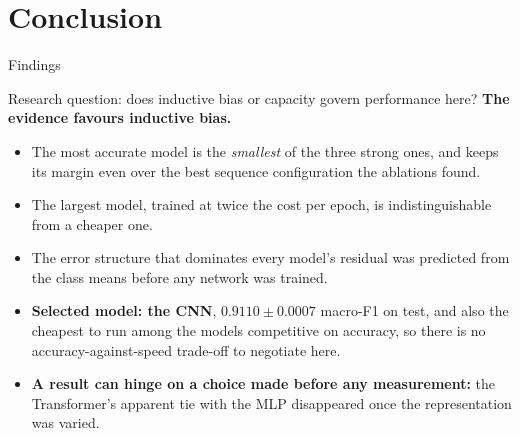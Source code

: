 
\section{Conclusion}

\begin{frame}{Findings}
\small
\begin{block}{Research question: does inductive bias or capacity govern performance here?}
\textbf{The evidence favours inductive bias.}
\end{block}

\begin{itemize}
    \item The most accurate model is the \emph{smallest} of the three strong ones, and keeps its margin
          even over the best sequence configuration the ablations found.
    \item The largest model, trained at twice the cost per epoch, is indistinguishable from a cheaper one.
    \item The error structure that dominates every model's residual was predicted from the class means
          before any network was trained.
    \item \textbf{Selected model: the CNN}, $0.9110 \pm 0.0007$ macro-F1 on test, and also the cheapest
          to run among the models competitive on accuracy, so there is no accuracy-against-speed
          trade-off to negotiate here.
    \item \textbf{A result can hinge on a choice made before any measurement:} the Transformer's
          apparent tie with the MLP disappeared once the representation was varied.
\end{itemize}
\end{frame}

